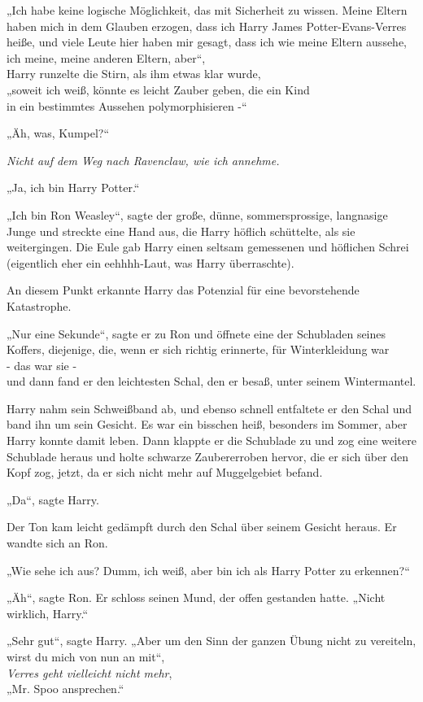 {„Ich habe keine logische Möglichkeit, das mit Sicherheit zu wissen. Meine Eltern haben mich in dem Glauben erzogen, dass ich Harry James Potter-Evans-Verres heiße, und viele Leute hier haben mir gesagt, dass ich wie meine Eltern aussehe, ich meine, meine anderen Eltern, aber“,\\ Harry runzelte die Stirn, als ihm etwas klar wurde,\\ „soweit ich weiß, könnte es leicht Zauber geben, die ein Kind\\ in ein bestimmtes Aussehen polymorphisieren -“

„Äh, was, Kumpel?“

\emph{Nicht auf dem Weg nach Ravenclaw, wie ich annehme.}

„Ja, ich bin Harry Potter.“

„Ich bin Ron Weasley“, sagte der große, dünne, sommersprossige, langnasige Junge und streckte eine Hand aus, die Harry höflich schüttelte, als sie weitergingen. Die Eule gab Harry einen seltsam gemessenen und höflichen Schrei (eigentlich eher ein eehhhh-Laut, was Harry überraschte).

An diesem Punkt erkannte Harry das Potenzial für eine bevorstehende Katastrophe.

„Nur eine Sekunde“, sagte er zu Ron und öffnete eine der Schubladen seines Koffers, diejenige, die, wenn er sich richtig erinnerte, für Winterkleidung war\\ - das war sie -\\ und dann fand er den leichtesten Schal, den er besaß, unter seinem Wintermantel.

Harry nahm sein Schweißband ab, und ebenso schnell entfaltete er den Schal und band ihn um sein Gesicht. Es war ein bisschen heiß, besonders im Sommer, aber Harry konnte damit leben. Dann klappte er die Schublade zu und zog eine weitere Schublade heraus und holte schwarze Zaubererroben hervor, die er sich über den Kopf zog, jetzt, da er sich nicht mehr auf Muggelgebiet befand.

„Da“, sagte Harry.

Der Ton kam leicht gedämpft durch den Schal über seinem Gesicht heraus. Er wandte sich an Ron.

„Wie sehe ich aus? Dumm, ich weiß, aber bin ich als Harry Potter zu erkennen?“

„Äh“, sagte Ron. Er schloss seinen Mund, der offen gestanden hatte. „Nicht wirklich, Harry.“

„Sehr gut“, sagte Harry. „Aber um den Sinn der ganzen Übung nicht zu vereiteln, wirst du mich von nun an mit“,\\ \emph{Verres geht vielleicht nicht mehr},\\ „Mr. Spoo ansprechen.“

}
